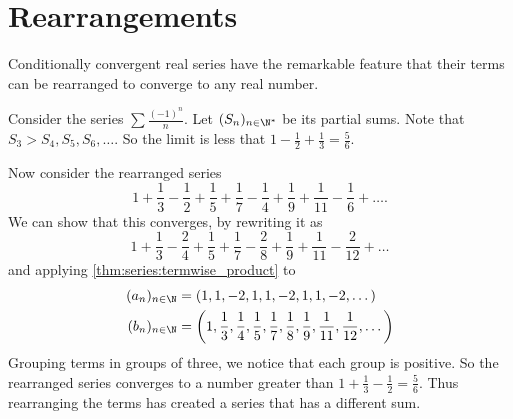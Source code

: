 \section{Rearrangements} \label{sec:rearrangements}
Conditionally convergent real series have the remarkable feature that their
terms can be rearranged to converge to any real number.
\begin{example}
    Consider the series $\sum \frac{(-1)^n}{n}$.
    Let $(S_n)_{n \in \N^*}$ be its partial sums.
    Note that $S_3 > S_4, S_5, S_6, \dots$.
    So the limit is less that $1 - \frac12 + \frac13 = \frac{5}{6}$.

    Now consider the rearranged series \[
        1 + \frac13 - \frac12
        + \frac15 + \frac17 - \frac14
        + \frac19 + \frac1{11} - \frac16
        + \dots.
    \] We can show that this converges, by rewriting it as \[
        1 + \frac13 - \frac{2}{4}
        + \frac15 + \frac17 - \frac{2}{8}
        + \frac19 + \frac1{11} - \frac{2}{12}
        + \dots
    \] and applying \cref{thm:series:termwise_product} to \begin{align*}
        (a_n)_{n \in \N} &= (1, 1, -2, 1, 1, -2, 1, 1, -2, \dots) \\
        (b_n)_{n \in \N} &=
            \left(1, \frac13, \frac14,
            \frac15, \frac17, \frac18,
            \frac19, \frac1{11}, \frac1{12},
            \dots\right)
    \end{align*}
    Grouping terms in groups of three, we notice that each group is
    positive.
    So the rearranged series converges to a number greater than
    $1 + \frac13 - \frac12 = \frac{5}{6}$.
    Thus rearranging the terms has created a series that has a different
    sum.
\end{example}
